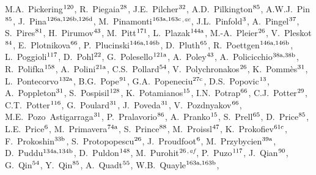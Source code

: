 \begin{flushleft}
M.A.~Pickering$^\textrm{\scriptsize 120}$,
R.~Piegaia$^\textrm{\scriptsize 28}$,
J.E.~Pilcher$^\textrm{\scriptsize 32}$,
A.D.~Pilkington$^\textrm{\scriptsize 85}$,
A.W.J.~Pin$^\textrm{\scriptsize 85}$,
J.~Pina$^\textrm{\scriptsize 126a,126b,126d}$,
M.~Pinamonti$^\textrm{\scriptsize 163a,163c}$$^{,ae}$,
J.L.~Pinfold$^\textrm{\scriptsize 3}$,
A.~Pingel$^\textrm{\scriptsize 37}$,
S.~Pires$^\textrm{\scriptsize 81}$,
H.~Pirumov$^\textrm{\scriptsize 43}$,
M.~Pitt$^\textrm{\scriptsize 171}$,
L.~Plazak$^\textrm{\scriptsize 144a}$,
M.-A.~Pleier$^\textrm{\scriptsize 26}$,
V.~Pleskot$^\textrm{\scriptsize 84}$,
E.~Plotnikova$^\textrm{\scriptsize 66}$,
P.~Plucinski$^\textrm{\scriptsize 146a,146b}$,
D.~Pluth$^\textrm{\scriptsize 65}$,
R.~Poettgen$^\textrm{\scriptsize 146a,146b}$,
L.~Poggioli$^\textrm{\scriptsize 117}$,
D.~Pohl$^\textrm{\scriptsize 22}$,
G.~Polesello$^\textrm{\scriptsize 121a}$,
A.~Poley$^\textrm{\scriptsize 43}$,
A.~Policicchio$^\textrm{\scriptsize 38a,38b}$,
R.~Polifka$^\textrm{\scriptsize 158}$,
A.~Polini$^\textrm{\scriptsize 21a}$,
C.S.~Pollard$^\textrm{\scriptsize 54}$,
V.~Polychronakos$^\textrm{\scriptsize 26}$,
K.~Pomm\`es$^\textrm{\scriptsize 31}$,
L.~Pontecorvo$^\textrm{\scriptsize 132a}$,
B.G.~Pope$^\textrm{\scriptsize 91}$,
G.A.~Popeneciu$^\textrm{\scriptsize 27c}$,
D.S.~Popovic$^\textrm{\scriptsize 13}$,
A.~Poppleton$^\textrm{\scriptsize 31}$,
S.~Pospisil$^\textrm{\scriptsize 128}$,
K.~Potamianos$^\textrm{\scriptsize 15}$,
I.N.~Potrap$^\textrm{\scriptsize 66}$,
C.J.~Potter$^\textrm{\scriptsize 29}$,
C.T.~Potter$^\textrm{\scriptsize 116}$,
G.~Poulard$^\textrm{\scriptsize 31}$,
J.~Poveda$^\textrm{\scriptsize 31}$,
V.~Pozdnyakov$^\textrm{\scriptsize 66}$,
M.E.~Pozo~Astigarraga$^\textrm{\scriptsize 31}$,
P.~Pralavorio$^\textrm{\scriptsize 86}$,
A.~Pranko$^\textrm{\scriptsize 15}$,
S.~Prell$^\textrm{\scriptsize 65}$,
D.~Price$^\textrm{\scriptsize 85}$,
L.E.~Price$^\textrm{\scriptsize 6}$,
M.~Primavera$^\textrm{\scriptsize 74a}$,
S.~Prince$^\textrm{\scriptsize 88}$,
M.~Proissl$^\textrm{\scriptsize 47}$,
K.~Prokofiev$^\textrm{\scriptsize 61c}$,
F.~Prokoshin$^\textrm{\scriptsize 33b}$,
S.~Protopopescu$^\textrm{\scriptsize 26}$,
J.~Proudfoot$^\textrm{\scriptsize 6}$,
M.~Przybycien$^\textrm{\scriptsize 39a}$,
D.~Puddu$^\textrm{\scriptsize 134a,134b}$,
D.~Puldon$^\textrm{\scriptsize 148}$,
M.~Purohit$^\textrm{\scriptsize 26}$$^{,af}$,
P.~Puzo$^\textrm{\scriptsize 117}$,
J.~Qian$^\textrm{\scriptsize 90}$,
G.~Qin$^\textrm{\scriptsize 54}$,
Y.~Qin$^\textrm{\scriptsize 85}$,
A.~Quadt$^\textrm{\scriptsize 55}$,
W.B.~Quayle$^\textrm{\scriptsize 163a,163b}$,

\end{flushleft}
